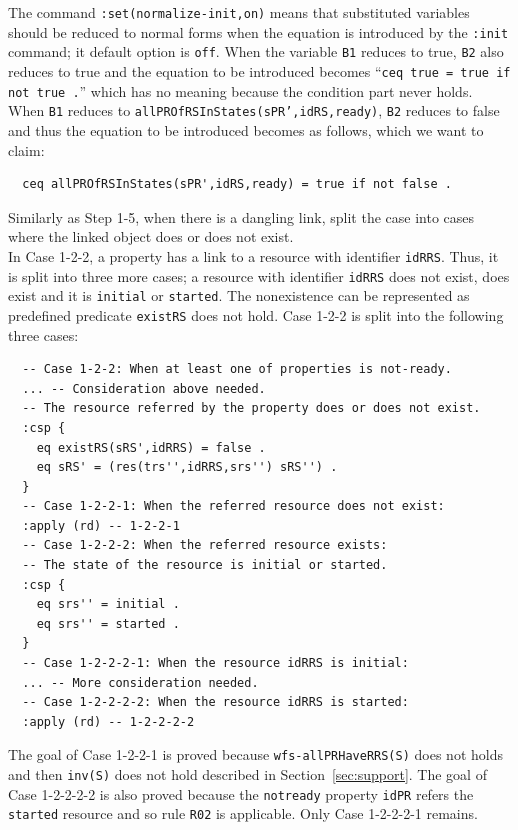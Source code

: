 \documentclass[12pt]{report}
\newcommand{\stt}[1]{{\small{\tt {#1}}}}
\begin{document}
The command \stt{:set(normalize-init,on)} means that substituted
variables should be reduced to normal forms when the equation is
introduced by the {\tt :init} command; it default option is {\tt off}.
When the variable {\tt B1} reduces to true, {\tt B2} also reduces to
true and the equation to be introduced becomes ``\stt{ceq true = true if
  not true .}''  which has no meaning because the condition part never
holds.  When {\tt B1} reduces to
\stt{allPROfRSInStates(sPR',idRS,ready)}, {\tt B2} reduces to false
and thus the equation to be introduced becomes as follows, which we
want to claim:
\begin{verbatim}
  ceq allPROfRSInStates(sPR',idRS,ready) = true if not false .
\end{verbatim}

\vspace{0.3cm}
 Similarly as Step 1-5, when there is a
dangling link, split the case into cases where the linked object does
or does not exist. \\ In Case 1-2-2, a property has a link to a
resource with identifier {\tt idRRS}. Thus, it is split into three
more cases; a resource with identifier {\tt idRRS} does not exist,
does exist and it is {\tt initial} or {\tt started}. The nonexistence
can be represented as predefined predicate {\tt existRS} does not
hold. Case 1-2-2 is split into the following three cases:
\begin{verbatim}
  -- Case 1-2-2: When at least one of properties is not-ready.
  ... -- Consideration above needed.
  -- The resource referred by the property does or does not exist.
  :csp {
    eq existRS(sRS',idRRS) = false .
    eq sRS' = (res(trs'',idRRS,srs'') sRS'') .
  }
  -- Case 1-2-2-1: When the referred resource does not exist:
  :apply (rd) -- 1-2-2-1
  -- Case 1-2-2-2: When the referred resource exists:
  -- The state of the resource is initial or started.
  :csp { 
    eq srs'' = initial .
    eq srs'' = started .
  }
  -- Case 1-2-2-2-1: When the resource idRRS is initial:
  ... -- More consideration needed.
  -- Case 1-2-2-2-2: When the resource idRRS is started:
  :apply (rd) -- 1-2-2-2-2
\end{verbatim}
The goal of Case 1-2-2-1 is proved because \stt{wfs-allPRHaveRRS(S)}
does not holds and then \stt{inv(S)} does not hold described in
Section~\ref{sec:support}.  The goal of Case 1-2-2-2-2 is also proved
because the {\tt notready} property {\tt idPR} refers the {\tt
  started} resource and so rule {\tt R02} is applicable.  Only Case
1-2-2-2-1 remains.\\
\end{document}
